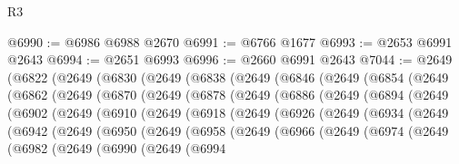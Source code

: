 \begin{lexlean}{R3}
\begin{coremodule}
@6990 := @6986 @6988 @2670
@6991 := @6766 @1677
@6993 := @2653 @6991 @2643
@6994 := @2651 @6993
@6996 := @2660 @6991 @2643
@7044 := @2649
    (@6822
      (@2649
        (@6830
          (@2649
            (@6838
              (@2649
                (@6846
                  (@2649
                    (@6854
                      (@2649
                        (@6862
                          (@2649
                            (@6870
                              (@2649
                                (@6878
                                  (@2649
                                    (@6886
                                      (@2649
                                        (@6894
                                          (@2649
                                            (@6902
                                              (@2649
                                                (@6910
                                                  (@2649
                                                    (@6918
                                                      (@2649
                                                        (@6926
                                                          (@2649
                                                            (@6934
                                                              (@2649
                                                                (@6942
                                                                  (@2649
                                                                    (@6950
                                                                      (@2649
                                                                        (@6958
                                                                          (@2649
                                                                            (@6966
                                                                              (@2649
                                                                                (@6974
                                                                                  (@2649
                                                                                    (@6982
                                                                                      (@2649
                                                                                        (@6990
                                                                                          (@2649
                                                                                            (@6994

\end{coremodule}
\end{lexlean}
